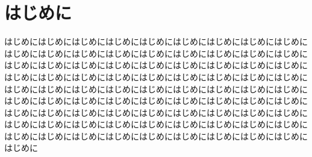 

\section{はじめに} %
\label{sec:はじめに}

	はじめにはじめにはじめにはじめにはじめにはじめにはじめにはじめにはじめにはじめにはじめにはじめにはじめにはじめにはじめにはじめにはじめにはじめにはじめにはじめにはじめにはじめにはじめにはじめにはじめにはじめにはじめにはじめにはじめにはじめにはじめにはじめにはじめにはじめにはじめにはじめにはじめにはじめにはじめにはじめにはじめにはじめにはじめにはじめにはじめにはじめにはじめにはじめにはじめにはじめにはじめにはじめにはじめにはじめにはじめにはじめにはじめにはじめにはじめにはじめにはじめにはじめにはじめにはじめにはじめにはじめにはじめにはじめにはじめにはじめにはじめにはじめにはじめにはじめにはじめにはじめにはじめにはじめにはじめにはじめにはじめにはじめに



